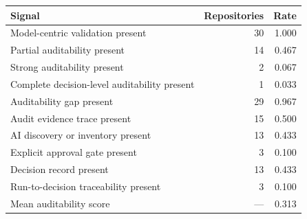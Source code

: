 \begin{tabular}{lrr}
\toprule
Signal & Repositories & Rate \\
\midrule
Model-centric validation present & 30 & 1.000 \\
Partial auditability present & 14 & 0.467 \\
Strong auditability present & 2 & 0.067 \\
Complete decision-level auditability present & 1 & 0.033 \\
Auditability gap present & 29 & 0.967 \\
Audit evidence trace present & 15 & 0.500 \\
AI discovery or inventory present & 13 & 0.433 \\
Explicit approval gate present & 3 & 0.100 \\
Decision record present & 13 & 0.433 \\
Run-to-decision traceability present & 3 & 0.100 \\
Mean auditability score & --- & 0.313 \\
\bottomrule
\end{tabular}
